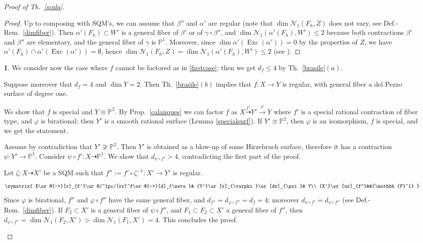 \documentclass[a4paper,12pt]{amsart}
\theoremstyle{definition}
\newtheorem{prg}[thm]{}
\numberwithin{figure}{section}
\numberwithin{table}{section}
\newcommand{\ph}{\varphi}
\newcommand{\pr}{\mathbb{P}}
\newcommand{\N}{\mathcal{N}_1}
\newcommand{\Exc}{\operatorname{Exc}}
\begin{document}
\begin{proof}[Proof of Th.~\ref{scala}]
\begin{proof}
  Up to composing with SQM's, we can assume that $\beta''$  and $\alpha'$ are regular (note that $\dim\N(F_h,Z)$ does not vary, see Def.-Rem.~\ref{dimfiber}). Then $\alpha'(F_h)\subset W'$ is a general fiber of $\beta'$ or of $\gamma\circ \beta''$, and $\dim\N(\alpha'(F_h),W')\leq 2$ because both contractions $\beta'$ and $\beta''$ are elementary, and the general fiber of $\gamma$ is $\pr^1$. Moreover, since $\dim \alpha'(\Exc(\alpha'))=0$ by the properties of $Z$, we have $\alpha'(F_h)\cap \alpha'(\Exc(\alpha'))=\emptyset$, hence $\dim\N(F_h, Z)=\dim\N(\alpha'(F_h),W')\leq 2$ (see \cite[Lemma 2.17]{fibrations}).
\end{proof}
\begin{prg}
  We consider now the case where $f$ cannot be factored as in \ref{firstcase}; then we get $d_f\leq 4$ by
  Th.~\ref{brasile}$(a)$.

  Suppose moreover  that
$d_f= 4$ and $\dim Y=2$. Then Th.~\ref{brasile}$(b)$ implies that
$f\colon X\to Y$ is regular, with general fiber a del Pezzo surface of degree one.

We show that $f$ is special and $Y\cong\pr^2$.
By Prop.~\ref{calanques} we can factor $f$ as $X\stackrel{f'}{\dasharrow} Y'\stackrel{\ph}{\to}Y$ where $f'$ is a special rational contraction of fiber type, and $\ph$ is birational; then $Y'$ is a smooth rational surface (Lemma \ref{specialsurf}). If $Y'\cong\pr^2$, then $\ph$ is an isomorphism, $f$ is special, and we get the statement.

Assume by contradiction that $Y'\not\cong\pr^2$. Then $Y'$ is obtained as a blow-up of some Hirzebruch surface, therefore it has a contraction $\psi\colon Y'\to\pr^1$. Consider $\psi\circ f'\colon X\dasharrow\pr^1$. We show that $d_{\psi\circ f'}>4$, contradicting the first part of the proof.

  Let $\zeta\colon X\dasharrow X'$ be a SQM such that
  $f'':=f'\circ\zeta^{-1}\colon X'\to Y'$ is regular.
$$\xymatrix{ X\ar@{-->}[r]_{f'}\ar@/^1pc/[rr]^f\ar@{-->}[d]_{\zeta}&
  {Y'}\ar[r]_{\ph}\ar[dr]_{\psi}& Y\\
  {X'}\ar[ur]_{f''}&&{\pr^1}
  }$$
 Since $\ph$ is birational, $f''$ and $\ph\circ f''$ have the same general fiber, and
 $d_{f''}=d_{\ph\circ f''}=d_f=4$; moreover  $d_{\psi\circ f'}=d_{\psi\circ f''}$ (see Def.-Rem.~\ref{dimfiber}). 
 If $F_2\subset X'$ is a general fiber of $\psi\circ f''$, and $F_1\subset F_2\subset X'$ a general fiber of $f''$, then $d_{\psi\circ f''}=\dim\N(F_2,X')>\dim\N(F_1,X')= 4$. This concludes the proof.  \qedhere
\end{prg}
\end{proof}
\end{document}
